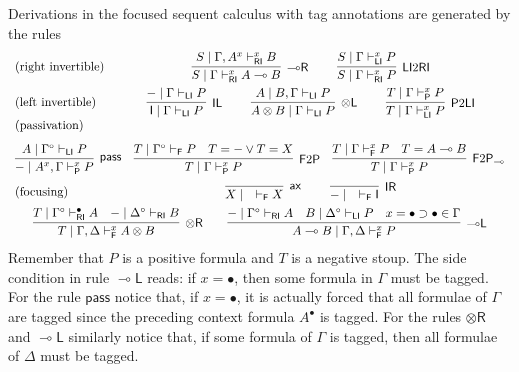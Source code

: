 \documentclass[copyright,creativecommons]{eptcs}
\theoremstyle{definition}
\newcommand{\tl}{\otimes \mathsf{L}}
\newcommand{\tr}{\otimes \mathsf{R}}
\newcommand{\lright}{{\multimap}\mathsf{R}}
\newcommand{\lleft}{{\multimap}\mathsf{L}}
\newcommand{\pass}{\mathsf{pass}}
\newcommand{\unitl}{\mathsf{IL}}
\newcommand{\unitr}{\mathsf{IR}}
\newcommand{\ax}{\mathsf{ax}}
\newcommand{\ot}{\otimes}
\newcommand{\lolli}{\multimap}
\newcommand{\I}{\mathsf{I}}
\newcommand{\RI}{\mathsf{RI}}
\newcommand{\LI}{\mathsf{LI}}
\newcommand{\Pass}{\mathsf{P}}
\newcommand{\F}{\mathsf{F}}
\newcommand{\xvdash}{\vdash^{x}}
\newcommand{\proofbox}[1]{\begin{tabular}{l} #1 \end{tabular}}
\begin{document}
Derivations in the focused sequent calculus with tag annotations are generated by the rules
\begin{equation}\label{eq:focus}
  \begin{array}{lc}
    \text{(right invertible)} & %
    \proofbox{
      \infer[\lright]{S \mid \Gamma \vdash^{x}_{\RI} A \lolli B}{S \mid \Gamma , A^{x} \vdash^{x}_{\RI} B}
    \qquad
    \infer[\LI 2 \RI]{S \mid \Gamma \vdash^{x}_{\RI} P}{S \mid \Gamma \vdash^{x}_{\LI} P}
    }
    \\[10pt]
    \text{(left invertible)} & %
    \proofbox{
      \infer[\unitl]{\I \mid \Gamma \vdash_{\LI} P}{{-} \mid \Gamma \vdash_{\LI} P}
    \qquad
    \infer[\tl]{A \ot B \mid \Gamma \vdash_{\LI} P}{A \mid B , \Gamma \vdash_{\LI} P}
    \qquad
    \infer[\Pass 2 \LI]{T \mid \Gamma \xvdash_{\LI} P}{T \mid \Gamma \xvdash_{\Pass} P}
    }
    \\
    \text{(passivation)} \\[8pt]
   \multicolumn{2}{c}{
    \infer[\pass]{{-} \mid A^{x} , \Gamma \xvdash_{\Pass} P }{
      A\mid \Gamma^{\circ} \vdash_{\LI} P
    }
    \quad
%
    \infer[\F 2 \Pass]{T \mid \Gamma \xvdash_{\Pass} P}{
      T \mid \Gamma^\circ \vdash_{\F} P &
      T = {-} \vee T = X
    }
    \quad
    \infer[\F 2 \Pass_{{\lolli}}]{T \mid \Gamma \xvdash_{\Pass} P}{
      T \mid \Gamma \xvdash_{\F} P &
      T = A \lolli B
    }
    }
    \\[6pt]
    \text{(focusing)} &    %
    \proofbox{\infer[\ax]{X \mid \quad \vdash_{\F} X}{}
    \qquad
    \infer[\unitr]{{-} \mid \quad \vdash_{\F} \I}{}
    }
    \\[6pt]
    \multicolumn{2}{c}{
    \infer[\tr]{T \mid \Gamma , \Delta \xvdash_{\F} A \ot B}{
      T \mid \Gamma^{\circ} \vdash^{\bullet}_{\RI} A
      &
      {-} \mid \Delta^{\circ} \vdash_{\RI} B
    }
    \qquad
    \infer[\lleft]{A \lolli B \mid \Gamma , \Delta \xvdash_{\F} P}{
      {-} \mid \Gamma^{\circ} \vdash_{\RI} A
      &
      B \mid \Delta^{\circ} \vdash_{\LI} P
      &
      x = \bullet \supset \bullet \in \Gamma
    }
    }
  \end{array}
\end{equation}
Remember that $P$ is a positive formula and $T$ is a negative stoup. The side condition in rule $\lleft$ reads: if $x = \bullet$, then some formula in $\Gamma$ must be tagged. For the rule $\pass$ notice that, if $x = \bullet$, it is actually forced that all formulae of $\Gamma$ are tagged since the preceding context formula $A^\bullet$ is tagged. For the rules $\tr$ and $\lleft$ similarly notice that, 
if some formula of $\Gamma$ is tagged, then all formulae of $\Delta$ must be tagged. 
\end{document}
